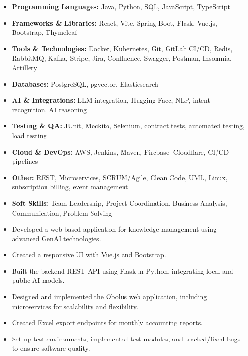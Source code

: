 
\begin{itemize}
  \item \textbf{Programming Languages:} Java, Python, SQL, JavaScript, TypeScript
  \item \textbf{Frameworks \& Libraries:} React, Vite, Spring Boot, Flask, Vue.js, Bootstrap, Thymeleaf
  \item \textbf{Tools \& Technologies:} Docker, Kubernetes, Git, GitLab CI/CD, Redis, RabbitMQ, Kafka, Stripe, Jira, Confluence, Swagger, Postman, Insomnia, Artillery
  \item \textbf{Databases:} PostgreSQL, pgvector, Elasticsearch
  \item \textbf{AI \& Integrations:} LLM integration, Hugging Face, NLP, intent recognition, AI reasoning
  \item \textbf{Testing \& QA:} JUnit, Mockito, Selenium, contract tests, automated testing, load testing
  \item \textbf{Cloud \& DevOps:} AWS, Jenkins, Maven, Firebase, Cloudflare, CI/CD pipelines
  \item \textbf{Other:} REST, Microservices, SCRUM/Agile, Clean Code, UML, Linux, subscription billing, event management
  \item \textbf{Soft Skills:} Team Leadership, Project Coordination, Business Analysis, Communication, Problem Solving
\end{itemize}


\begin{itemize}
\item Developed a web-based application for knowledge management using advanced GenAI technologies.
\item Created a responsive UI with Vue.js and Bootstrap.
\item Built the backend REST API using Flask in Python, integrating local and public AI models.
\end{itemize}

\divider

\begin{itemize}
\item Designed and implemented the Obolus web application, including microservices for scalability and flexibility.
\item Created Excel export endpoints for monthly accounting reports.
\item Set up test environments, implemented test modules, and tracked/fixed bugs to ensure software quality.
\end{itemize}

